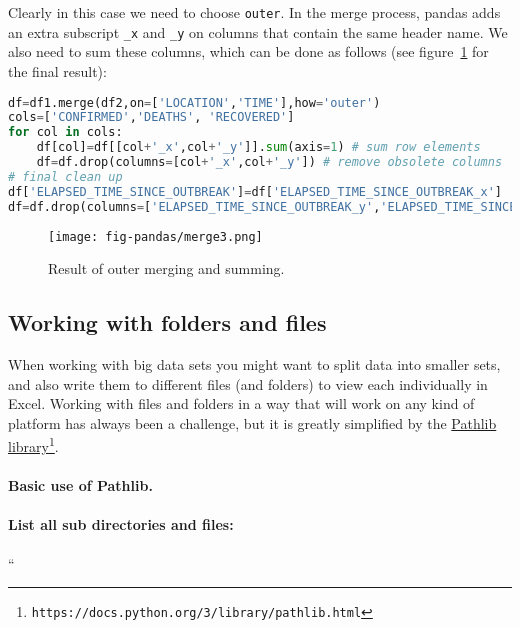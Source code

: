 \documentclass[graybox,sectrefs,envcountresetchap,open=right,final]{svmonodo}
\begin{document}
Clearly in this case we need to choose \texttt{outer}. In the merge process, pandas adds an extra subscript \Verb!_x! and \Verb!_y! on columns that contain the same header name. We also need to sum these columns, which can be done as follows
(see figure~\ref{fig:pandas:merge3} for the final result):










\begin{lstlisting}[language=python,style=blue1bar]
df=df1.merge(df2,on=['LOCATION','TIME'],how='outer')
cols=['CONFIRMED','DEATHS', 'RECOVERED']
for col in cols:
    df[col]=df[[col+'_x',col+'_y']].sum(axis=1) # sum row elements
    df=df.drop(columns=[col+'_x',col+'_y']) # remove obsolete columns
# final clean up
df['ELAPSED_TIME_SINCE_OUTBREAK']=df['ELAPSED_TIME_SINCE_OUTBREAK_x']		
df=df.drop(columns=['ELAPSED_TIME_SINCE_OUTBREAK_y','ELAPSED_TIME_SINCE_OUTBREAK_x'])

\end{lstlisting}


\begin{figure}[!ht]  %
  \centerline{\texttt{[image: fig-pandas/merge3.png]}}
  \caption{
  Result of outer merging and summing. \label{fig:pandas:merge3}
  }
\end{figure}

\subsection{Working with folders and files}
When working with big data sets you might want to split data into smaller sets, and also write them to different files (and folders) to view each individually in Excel. Working with files and folders in a way that will work on any kind of platform has always been a challenge, but it is greatly simplified by the \href{{https://docs.python.org/3/library/pathlib.html}}{Pathlib library}\footnote{\texttt{https://docs.python.org/3/library/pathlib.html}}.

\paragraph{Basic use of Pathlib.}
\paragraph{List all sub directories and files:}
``
\end{document}
